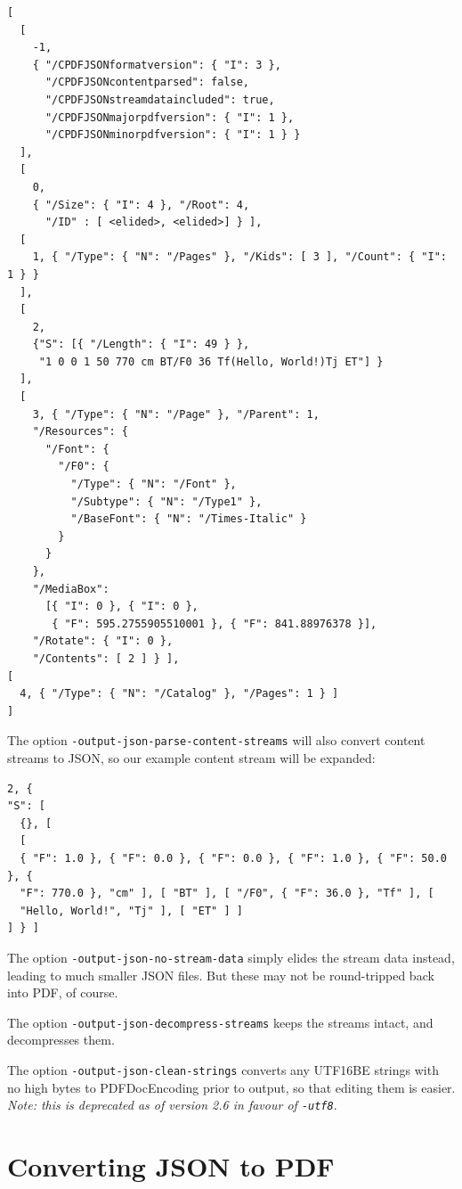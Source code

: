 \documentclass{book}
\begin{document}
{\small\begin{verbatim}
[
  [
    -1,
    { "/CPDFJSONformatversion": { "I": 3 },
      "/CPDFJSONcontentparsed": false,
      "/CPDFJSONstreamdataincluded": true,
      "/CPDFJSONmajorpdfversion": { "I": 1 },
      "/CPDFJSONminorpdfversion": { "I": 1 } }
  ],
  [
    0,
    { "/Size": { "I": 4 }, "/Root": 4,
      "/ID" : [ <elided>, <elided>] } ],
  [
    1, { "/Type": { "N": "/Pages" }, "/Kids": [ 3 ], "/Count": { "I": 1 } }
  ],
  [
    2,
    {"S": [{ "/Length": { "I": 49 } },
     "1 0 0 1 50 770 cm BT/F0 36 Tf(Hello, World!)Tj ET"] }
  ],
  [
    3, { "/Type": { "N": "/Page" }, "/Parent": 1,
    "/Resources": {
      "/Font": {
        "/F0": {
          "/Type": { "N": "/Font" },
          "/Subtype": { "N": "/Type1" },
          "/BaseFont": { "N": "/Times-Italic" }
        }
      }
    },
    "/MediaBox":
      [{ "I": 0 }, { "I": 0 },
       { "F": 595.2755905510001 }, { "F": 841.88976378 }],
    "/Rotate": { "I": 0 },
    "/Contents": [ 2 ] } ],
[
  4, { "/Type": { "N": "/Catalog" }, "/Pages": 1 } ]
]\end{verbatim}}

\noindent The option \texttt{-output-json-parse-content-streams} will also convert content streams to JSON, so our example content stream will be expanded:


{\small\begin{verbatim}
2, {
"S": [
  {}, [
  [
  { "F": 1.0 }, { "F": 0.0 }, { "F": 0.0 }, { "F": 1.0 }, { "F": 50.0 }, {
  "F": 770.0 }, "cm" ], [ "BT" ], [ "/F0", { "F": 36.0 }, "Tf" ], [
  "Hello, World!", "Tj" ], [ "ET" ] ]
] } ]
\end{verbatim}}

\noindent The option \texttt{-output-json-no-stream-data} simply elides the stream data instead, leading to much smaller JSON files. But these may not be round-tripped back into PDF, of course.

The option \texttt{-output-json-decompress-streams} keeps the streams intact, and decompresses them.

The option \texttt{-output-json-clean-strings} converts any UTF16BE strings with no high bytes to PDFDocEncoding prior to output, so that editing them is easier. \textit{Note: this is deprecated as of version 2.6 in favour of \texttt{\textup{-utf8}}}.

\section{Converting JSON to PDF}
\end{document}
